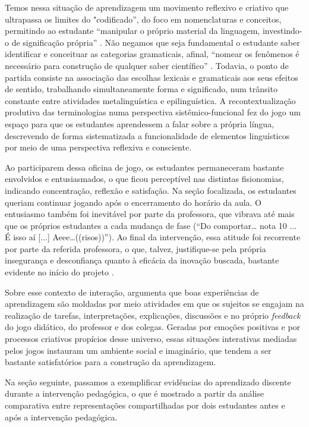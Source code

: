 	Temos nessa situação de aprendizagem um movimento reflexivo e criativo
	que ultrapassa os limites do "codificado'', do foco em nomenclaturas e
	conceitos, permitindo ao estudante ``manipular o próprio material da
	linguagem, investindo-o de significação própria'' \cite[p.
	13]{franchi_criatividade_1987}. Não negamos que seja fundamental o estudante saber identificar e
	conceituar as categorias gramaticais, afinal, ``nomear os fenômenos é
	necessário para construção de qualquer saber científico'' \cite[p. 217]{mendonca_alise_2006}. Todavia, o ponto de partida consiste na associação das
	escolhas lexicais e gramaticais aos seus efeitos de sentido, trabalhando
	simultaneamente forma e significado, num trânsito constante entre
	atividades metalinguística e epilinguística. A recontextualização
	produtiva das terminologias numa perspectiva sistêmico-funcional fez do
	jogo um espaço para que os estudantes aprendessem a falar sobre a
	própria língua, descrevendo de forma sistematizada a funcionalidade de
	elementos linguísticos por meio de uma perspectiva reflexiva e
	consciente.
	
	Ao participarem dessa oficina de jogo, os estudantes permaneceram
	bastante envolvidos e entusiasmados, o que ficou perceptível nas
	distintas fisionomias, indicando concentração, reflexão e satisfação. Na
	seção focalizada, os estudantes queriam continuar jogando após o
	encerramento do horário da aula. O entusiasmo também foi inevitável por
	parte da professora, que vibrava até mais que os próprios estudantes a
	cada mudança de fase (``Do comportar\ldots{} nota 10 ... É isso aí
	{[}...{]} Aeee\ldots((risos))''). Ao final da intervenção, essa atitude
	foi recorrente por parte da referida professora, o que, talvez,
	justifique-se pela própria insegurança e desconfiança quanto à eficácia
	da inovação buscada, bastante evidente no início do projeto \cite{santos_construcao_2021}.
	
	Sobre esse contexto de interação, \textcite{gee_bons_2009} argumenta que boas
	experiências de aprendizagem são moldadas por meio atividades em que os
	sujeitos se engajam na realização de tarefas, interpretações,
	explicações, discussões e no próprio \emph{feedback} do jogo didático,
	do professor e dos colegas. Geradas por emoções positivas e por
	processos criativos propícios desse universo, essas situações
	interativas mediadas pelos jogos instauram um ambiente social e
	imaginário, que tendem a ser bastante satisfatórios para a construção da
	aprendizagem.
	
	Na seção seguinte, passamos a exemplificar evidências do aprendizado
	discente durante a intervenção pedagógica, o que é mostrado a partir da
	análise comparativa entre representações compartilhadas por dois
	estudantes antes e após a intervenção pedagógica.

